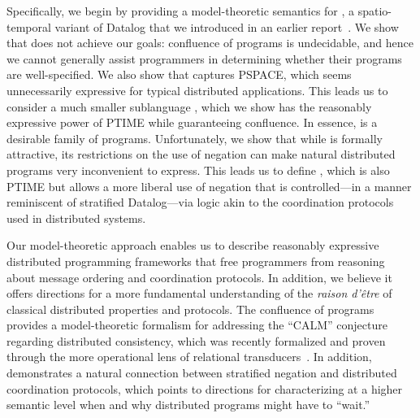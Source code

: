 Specifically, we begin by providing a model-theoretic semantics for \lang, a
spatio-temporal variant of Datalog that we introduced in an earlier
report~\cite{dedalus}.  We show that \lang does not achieve our goals:
confluence of \lang programs is undecidable, and hence we cannot generally
assist \lang programmers in determining whether their programs are
well-specified.  We also show that \lang captures PSPACE, which seems
unnecessarily expressive for typical distributed applications.  This leads us to
consider a much smaller sublanguage \slang, which we show has the reasonably
expressive power of PTIME while guaranteeing confluence. In essence, \slang is a
desirable family of \lang programs.  Unfortunately, we show that while \slang is
formally attractive, its restrictions on the use of negation can make natural
distributed programs very inconvenient to express.  This leads us to define
\plang, which is also PTIME but allows a more liberal use of negation that is
controlled---in a manner reminiscent of stratified Datalog---via logic akin to
the coordination protocols used in distributed systems.


Our model-theoretic approach enables us to describe reasonably expressive distributed programming frameworks that free programmers from reasoning about message ordering and coordination protocols.  In addition, we believe it offers directions for a more fundamental understanding of the {\em raison d'\^{e}tre} of classical distributed properties and protocols.
The confluence of \slang programs provides a model-theoretic formalism for addressing the ``CALM'' conjecture~\cite{declarative-imperative} regarding distributed consistency, which was recently formalized and proven through the more operational lens of relational transducers~\cite{relational-transducers}.  In addition, \plang demonstrates a natural connection between stratified negation and distributed coordination protocols, which points to directions for characterizing at a higher semantic level when and why distributed programs might have to ``wait.''
